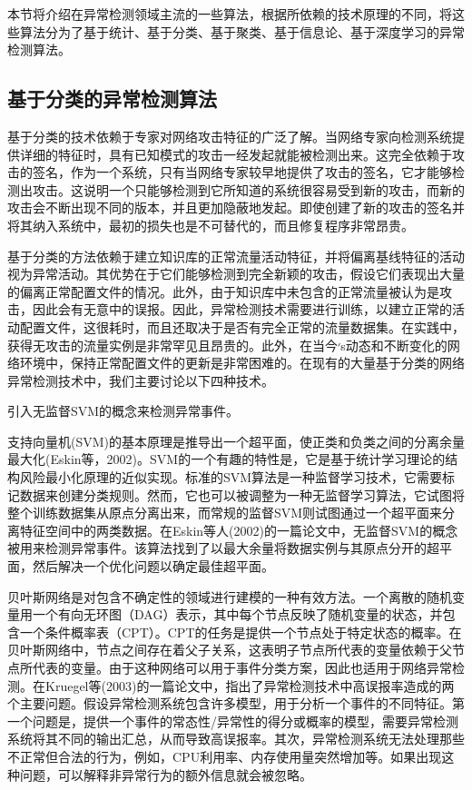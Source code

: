 本节将介绍在异常检测领域主流的一些算法，根据所依赖的技术原理的不同，将这些算法分为了基于统计、基于分类、基于聚类、基于信息论、基于深度学习的异常检测算法。

\subsection{基于分类的异常检测算法}

基于分类的技术依赖于专家对网络攻击特征的广泛了解。当网络专家向检测系统提供详细的特征时，具有已知模式的攻击一经发起就能被检测出来。这完全依赖于攻击的签名，作为一个系统，只有当网络专家较早地提供了攻击的签名，它才能够检测出攻击。这说明一个只能够检测到它所知道的系统很容易受到新的攻击，而新的攻击会不断出现不同的版本，并且更加隐蔽地发起。即使创建了新的攻击的签名并将其纳入系统中，最初的损失也是不可替代的，而且修复程序非常昂贵。

基于分类的方法依赖于建立知识库的正常流量活动特征，并将偏离基线特征的活动视为异常活动。其优势在于它们能够检测到完全新颖的攻击，假设它们表现出大量的偏离正常配置文件的情况。此外，由于知识库中未包含的正常流量被认为是攻击，因此会有无意中的误报。因此，异常检测技术需要进行训练，以建立正常的活动配置文件，这很耗时，而且还取决于是否有完全正常的流量数据集。在实践中，获得无攻击的流量实例是非常罕见且昂贵的。此外，在当今׳s动态和不断变化的网络环境中，保持正常配置文件的更新是非常困难的。在现有的大量基于分类的网络异常检测技术中，我们主要讨论以下四种技术。

\citet{2002AEskin} 引入无监督SVM的概念来检测异常事件。


支持向量机(SVM)的基本原理是推导出一个超平面，使正类和负类之间的分离余量最大化(Eskin等，2002)。SVM的一个有趣的特性是，它是基于统计学习理论的结构风险最小化原理的近似实现。标准的SVM算法是一种监督学习技术，它需要标记数据来创建分类规则。然而，它也可以被调整为一种无监督学习算法，它试图将整个训练数据集从原点分离出来，而常规的监督SVM则试图通过一个超平面来分离特征空间中的两类数据。在Eskin等人(2002)的一篇论文中，无监督SVM的概念被用来检测异常事件。该算法找到了以最大余量将数据实例与其原点分开的超平面，然后解决一个优化问题以确定最佳超平面。

贝叶斯网络是对包含不确定性的领域进行建模的一种有效方法。一个离散的随机变量用一个有向无环图（DAG）表示，其中每个节点反映了随机变量的状态，并包含一个条件概率表（CPT）。CPT的任务是提供一个节点处于特定状态的概率。在贝叶斯网络中，节点之间存在着父子关系，这表明子节点所代表的变量依赖于父节点所代表的变量。由于这种网络可以用于事件分类方案，因此也适用于网络异常检测。在Kruegel等(2003)的一篇论文中，指出了异常检测技术中高误报率造成的两个主要问题。假设异常检测系统包含许多模型，用于分析一个事件的不同特征。第一个问题是，提供一个事件的常态性/异常性的得分或概率的模型，需要异常检测系统将其不同的输出汇总，从而导致高误报率。其次，异常检测系统无法处理那些不正常但合法的行为，例如，CPU利用率、内存使用量突然增加等。如果出现这种问题，可以解释非异常行为的额外信息就会被忽略。

